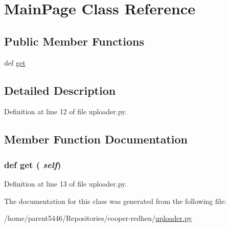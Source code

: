 \hypertarget{classuploader_1_1_main_page}{
\section{MainPage Class Reference}
\label{classuploader_1_1_main_page}
}
\subsection*{Public Member Functions}
\begin{DoxyCompactItemize}
\item 
def \hyperlink{classuploader_1_1_main_page_a444a1328efb32d5d9d2dcb2efe855d3b}{get}
\end{DoxyCompactItemize}


\subsection{Detailed Description}


Definition at line 12 of file uploader.py.



\subsection{Member Function Documentation}
\hypertarget{classuploader_1_1_main_page_a444a1328efb32d5d9d2dcb2efe855d3b}{
\subsubsection[{get}]{\setlength{\rightskip}{0pt plus 5cm}def get ( {\em self})}}
\label{classuploader_1_1_main_page_a444a1328efb32d5d9d2dcb2efe855d3b}


Definition at line 13 of file uploader.py.



The documentation for this class was generated from the following file:\begin{DoxyCompactItemize}
\item 
/home/parent5446/Repositories/cooper-\/redhen/\hyperlink{uploader_8py}{uploader.py}\end{DoxyCompactItemize}
